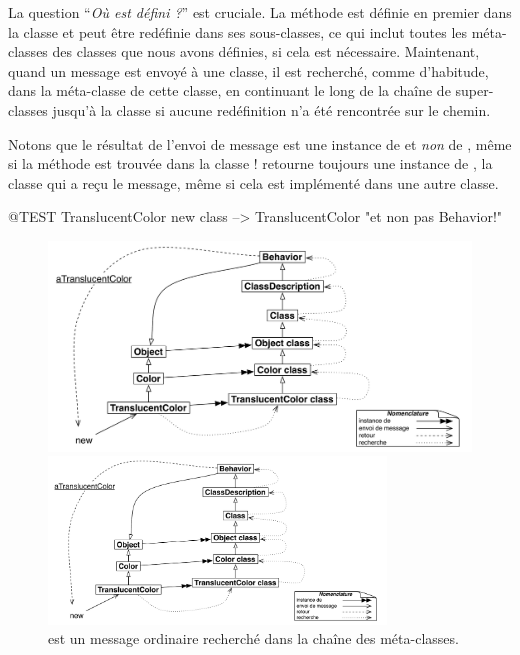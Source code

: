 \documentclass[a4paper,10pt,twoside]{book}
\begin{document}
La question ``\emph{Où est défini ?}'' est cruciale.
La méthode  est définie en premier dans la classe  et peut être redéfinie dans ses sous-classes, ce qui inclut toutes les méta-classes des classes que nous avons définies, si cela est nécessaire.
Maintenant, quand un message  est envoyé à une classe, il est recherché, comme d'habitude, dans la méta-classe de cette classe, en continuant le long de la chaîne de super-classes jusqu'à la classe  si aucune redéfinition n'a été rencontrée sur le chemin.

Notons que le résultat de l'envoi de message  est une instance de    et \emph{non} de , même si la méthode est trouvée dans la classe !   retourne toujours une instance de \self, la classe qui a reçu le message, même si cela est implémenté dans une autre classe.

\begin{code}{@TEST}
TranslucentColor new class --> TranslucentColor    "et non pas Behavior!"
\end{code}

\begin{center}
\begin{figure}
\ifluluelse
	{\centerline{\includegraphics[width=\textwidth]{TranslucentSendingNew}}}
	{\centerline{\includegraphics[width=0.8\textwidth]{TranslucentSendingNew}}}
\caption{ est un message ordinaire recherché dans la chaîne des méta-classes.}
\end{figure}
\end{center}
\end{document}
